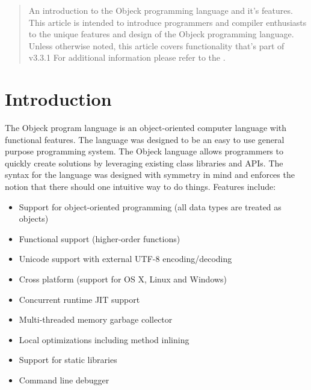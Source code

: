 \documentclass[11pt]{article}
\begin{document}
\maketitle
\thispagestyle{empty}

\vspace{\baselineskip}

\begin{abstract}
  An introduction to the Objeck programming language and it's
  features.  This article is intended to introduce programmers and
  compiler enthusiasts to the unique features and design of the Objeck
  programming language.  Unless otherwise noted, this article covers
  functionality that's part of v3.3.1  For additional information
  please refer to the
  .
\end{abstract}

\newpage
\tableofcontents
\newpage

\label{Introduction}
\section{Introduction}
The Objeck program language is an object-oriented computer language
with functional features.  The language was designed to be an easy to
use general purpose programming system.  The Objeck language allows
programmers to quickly create solutions by leveraging existing class
libraries and APIs.  The syntax for the language was designed with
symmetry in mind and enforces the notion that there should one
intuitive way to do things. Features include:
\begin{itemize}
\item Support for object-oriented programming (all data types are
  treated as objects)
\item Functional support (higher-order functions)
\item Unicode support with external UTF-8 encoding/decoding
\item Cross platform (support for OS X, Linux and Windows)
\item Concurrent runtime JIT support
\item Multi-threaded memory garbage collector
\item Local optimizations including method inlining
\item Support for static libraries
\item Command line debugger
\end{itemize}
\end{document}
